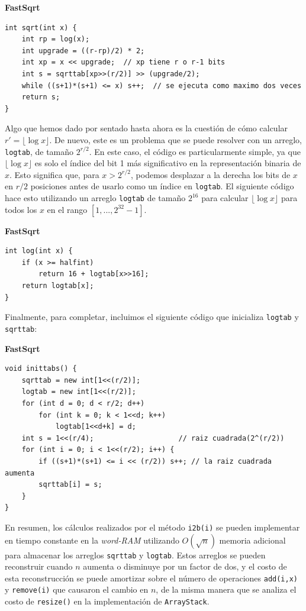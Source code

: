 \documentclass[11pt]{book}
\theoremstyle{plain}
\newcommand{\claseheader}[1]{\noindent\textbf{#1}\par\vspace{-4pt}}
\begin{document}
\claseheader{FastSqrt}
\begin{lstlisting}
int sqrt(int x) {
    int rp = log(x);
    int upgrade = ((r-rp)/2) * 2;
    int xp = x << upgrade;  // xp tiene r o r-1 bits
    int s = sqrttab[xp>>(r/2)] >> (upgrade/2);
    while ((s+1)*(s+1) <= x) s++;  // se ejecuta como maximo dos veces
    return s;
}
\end{lstlisting}

Algo que hemos dado por sentado hasta ahora es la cuestión de cómo calcular $r' = \lfloor\log x\rfloor$. De nuevo, este es un problema que se puede resolver con un arreglo, \texttt{logtab}, de tamaño $2^{r/2}$. En este caso, el código es particularmente simple, ya que $\lfloor\log x\rfloor$ es solo el índice del bit 1 más significativo en la representación binaria de $x$. Esto significa que, para $x > 2^{r/2}$, podemos desplazar a la derecha los bits de $x$ en $r/2$ posiciones antes de usarlo como un índice en \texttt{logtab}. El siguiente código hace esto utilizando un arreglo \texttt{logtab} de tamaño $2^{16}$ para calcular $\lfloor\log x\rfloor$ para todos los $x$ en el rango $[1,...,2^{32}-1]$.

\claseheader{FastSqrt}
\begin{lstlisting}
int log(int x) {
    if (x >= halfint)
        return 16 + logtab[x>>16];
    return logtab[x];
}
\end{lstlisting}

Finalmente, para completar, incluimos el siguiente código que inicializa \texttt{logtab} y \texttt{sqrttab}:

\claseheader{FastSqrt}
\begin{lstlisting}
void inittabs() {
    sqrttab = new int[1<<(r/2)];
    logtab = new int[1<<(r/2)];
    for (int d = 0; d < r/2; d++)
        for (int k = 0; k < 1<<d; k++)
            logtab[1<<d+k] = d;
    int s = 1<<(r/4);                    // raiz cuadrada(2^(r/2))
    for (int i = 0; i < 1<<(r/2); i++) {
        if ((s+1)*(s+1) <= i << (r/2)) s++; // la raiz cuadrada aumenta
        sqrttab[i] = s;
    }
}
\end{lstlisting}

En resumen, los cálculos realizados por el método \texttt{i2b(i)} se pueden implementar en tiempo constante en la \emph{word-RAM} utilizando $O(\sqrt{n})$ memoria adicional para almacenar los arreglos \texttt{sqrttab} y \texttt{logtab}. Estos arreglos se pueden reconstruir cuando $n$ aumenta o disminuye por un factor de dos, y el costo de esta reconstrucción se puede amortizar sobre el número de operaciones \texttt{add(i,x)} y \texttt{remove(i)} que causaron el cambio en $n$, de la misma manera que se analiza el costo de \texttt{resize()} en la implementación de \texttt{ArrayStack}.
\end{document}

